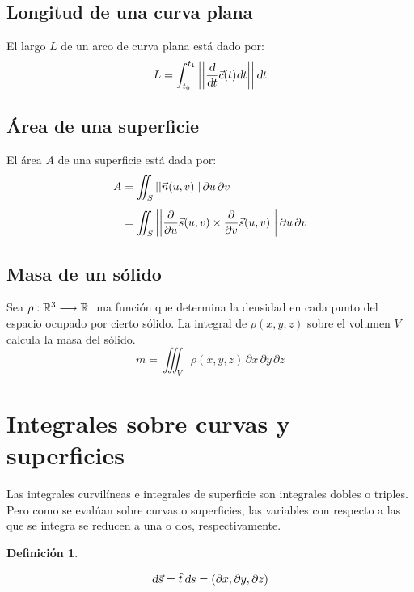 \documentclass[a5paper,12pt,twoside]{book}
\newtheorem{defn}{{Definición}}[chapter]
\begin{document}
\subsection{Longitud de una curva plana}

El largo $L$ de un arco de curva plana está dado por:
\begin{equation*}
    L = \int_{t_0}^{t_1} {\left|\left| { \dfrac{\textsl{d}}{\textsl{d} t} \Vec{c}(t) \textsl{d} t } \right|\right|} \, \textsl{d} t
\end{equation*}


\subsection{Área de una superficie}

El área $A$ de una superficie está dada por:
\begin{align*}
    A &= \iint_S {\left|\left| {\Vec{n}(u,v)} \right|\right|} \, \partial u \, \partial v
    \\[1ex]
    &= \iint_S {\left|\left| { \dfrac{\partial}{\partial u} \Vec{s}(u,v) \times \dfrac{\partial}{\partial v} \Vec{s}(u,v) } \right|\right|} \, \partial u \, \partial v
\end{align*}


\subsection{Masa de un sólido}

Sea $\rho:\mathbb{R}^3 \longrightarrow \mathbb{R}$ una función que determina la densidad en cada punto del espacio ocupado por cierto sólido.
La integral de $\rho (x,y,z)$ sobre el volumen $V$ calcula la masa del sólido.
\begin{equation*}
    m = \iiint_V \rho (x,y,z) \, \partial x \, \partial y \, \partial z
\end{equation*}


\section{Integrales sobre curvas y superficies}

Las integrales curvilíneas e integrales de superficie son integrales dobles o triples.
Pero como se evalúan sobre curvas o superficies, las variables con respecto a las que se integra se reducen a una o dos, respectivamente.

\begin{mdframed}[style=DefinitionFrame]
    \begin{defn}
    \end{defn}
    \begin{equation*}
        \textsl{d} \Vec{s} = \hat{t} \, \textsl{d} s = \left( \partial x, \partial y, \partial z \right)
    \end{equation*}
\end{mdframed}
\end{document}
